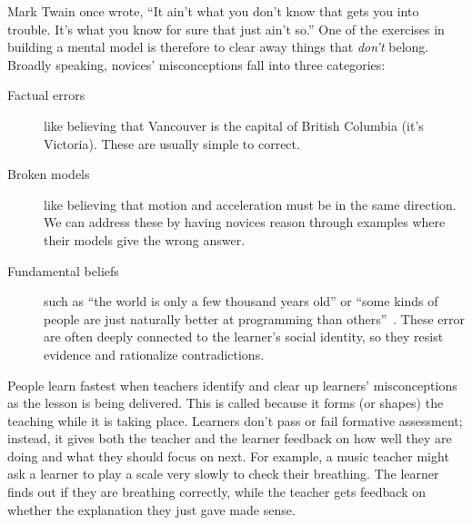 
Mark Twain once wrote,
``It ain't what you don't know that gets you into trouble.
It's what you know for sure that just ain't so.''
One of the exercises in building a mental model is therefore
to clear away things that \emph{don't} belong.
Broadly speaking,
novices' misconceptions fall into three categories:

\begin{description}

\item[Factual errors]
  like believing that Vancouver is the capital of British Columbia
  (it's Victoria).
  These are usually simple to correct.

\item[Broken models]
  like believing that motion and acceleration must be in the same direction.
  We can address these by having novices reason through examples
  where their models give the wrong answer.

\item[Fundamental beliefs]
  such as ``the world is only a few thousand years old''
  or ``some kinds of people are just naturally better at programming than others''~\cite{Guzd2015b,Pati2016}.
  These error are often deeply connected to the learner's social identity,
  so they resist evidence and rationalize contradictions.

\end{description}

People learn fastest when teachers identify and clear up learners' misconceptions
as the lesson is being delivered.
This is called 
because it forms (or shapes) the teaching while it is taking place.
Learners don't pass or fail formative assessment;
instead,
it gives both the teacher and the learner feedback on how well they are doing
and what they should focus on next.
For example,
a music teacher might ask a learner to play a scale very slowly to check their breathing.
The learner finds out if they are breathing correctly,
while the teacher gets feedback on whether the explanation they just gave made sense.

